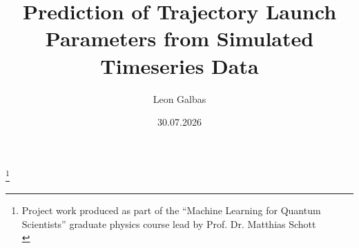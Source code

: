 \title{Prediction of Trajectory Launch Parameters from Simulated Timeseries Data}%
\thanks{
    Project work produced as part of the \enquote{Machine Learning for Quantum Scientists} graduate physics course lead by Prof. Dr. Matthias Schott \\
}%

\author{Leon Galbas}



\date{30.07.2026}
